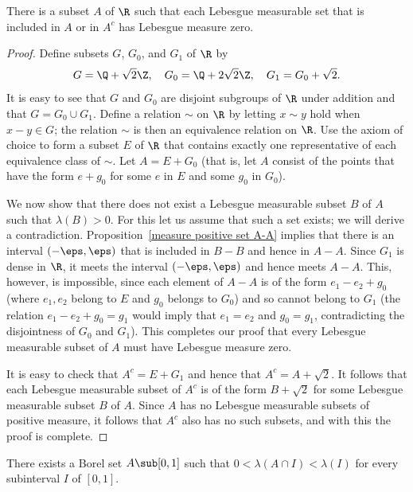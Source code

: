 \begin{proposition}
There is a subset $A$ of $\R$ such that each Lebesgue measurable set that is included in $A$ or in $A^c$ has Lebesgue measure zero.
\end{proposition}
\begin{proof}
Define subsets $G$, $G_0$, and $G_1$ of $\R$ by
\[G=\Q+\sqrt{2}\Z,\quad G_0=\Q+2\sqrt{2}\Z,\quad G_1=G_0+\sqrt{2}.\]
It is easy to see that $G$ and $G_0$ are disjoint subgroups of $\R$ under addition and that $G=G_0\cup G_1$. Define a relation $\sim$ on $\R$ by letting $x \sim y$ hold when $x-y\in G$; the relation $\sim$ is then an equivalence relation on $\R$. Use the axiom of choice to form a subset $E$ of $\R$ that contains exactly one representative of each equivalence class of $\sim$. Let $A=E+G_0$ (that is, let $A$ consist of the points that have the form $e+g_0$ for some $e$ in $E$ and some $g_0$ in $G_0$).\par
We now show that there does not exist a Lebesgue measurable subset $B$ of $A$ such that $\lambda(B)>0$. For this let us assume that such a set exists; we will derive a contradiction. Proposition~\ref{measure positive set A-A} implies that there is an interval $(-\eps,\eps)$ that is included in $B-B$ and hence in $A-A$. Since $G_1$ is dense in $\R$, it meets the interval $(-\eps,\eps)$ and hence meets $A-A$. This, however, is impossible, since each element of $A-A$ is of the form $e_1-e_2+g_0$ (where $e_1,e_2$ belong to $E$ and $g_0$ belongs to $G_0$) and so cannot belong to $G_1$ (the relation $e_1-e_2+g_0=g_1$ would imply that $e_1=e_2$ and $g_0=g_1$, contradicting the disjointness of $G_0$ and $G_1$). This completes our proof that every Lebesgue measurable subset of $A$ must have Lebesgue measure zero.\par
It is easy to check that $A^c=E+G_1$ and hence that $A^c=A+\sqrt{2}$. It follows that each Lebesgue measurable subset of $A^c$ is of the form $B+\sqrt{2}$ for some Lebesgue measurable subset $B$ of $A$. Since $A$ has no Lebesgue measurable subsets of positive measure, it follows that $A^c$ also has no such subsets, and with this the proof is complete.
\end{proof}
\begin{proposition}
There exists a Borel set $A\sub[0,1]$ such that $0<\lambda(A\cap I)<\lambda(I)$ for every subinterval $I$ of $[0,1]$.
\end{proposition}
